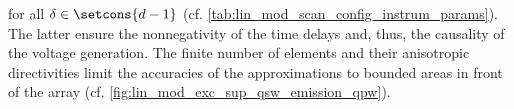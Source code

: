 for
all $\delta \in \setcons{ d - 1 }$
(cf. \cref{tab:lin_mod_scan_config_instrum_params}).
The latter ensure
the nonnegativity of
the time delays and, thus,
the causality of
the voltage generation.
The finite number of
elements and
their anisotropic directivities limit
the accuracies of
the approximations to
bounded areas in front of
the array
(cf. \cref{fig:lin_mod_exc_sup_qsw_emission_qpw}).

